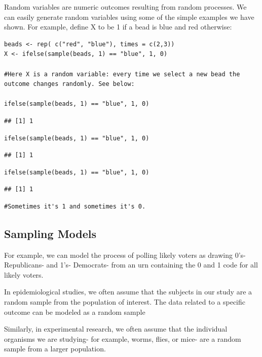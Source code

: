 \documentclass[
]{article}
\begin{document}
Random variables are numeric outcomes resulting from random processes.
We can easily generate random variables using some of the simple
examples we have shown. For example, define X to be 1 if a bead is blue
and red otherwise:

\begin{verbatim}
beads <- rep( c("red", "blue"), times = c(2,3))
X <- ifelse(sample(beads, 1) == "blue", 1, 0)

#Here X is a random variable: every time we select a new bead the outcome changes randomly. See below:

ifelse(sample(beads, 1) == "blue", 1, 0)
\end{verbatim}

\begin{verbatim}
## [1] 1
\end{verbatim}

\begin{verbatim}
ifelse(sample(beads, 1) == "blue", 1, 0)
\end{verbatim}

\begin{verbatim}
## [1] 1
\end{verbatim}

\begin{verbatim}
ifelse(sample(beads, 1) == "blue", 1, 0)
\end{verbatim}

\begin{verbatim}
## [1] 1
\end{verbatim}

\begin{verbatim}
#Sometimes it's 1 and sometimes it's 0.
\end{verbatim}

\hypertarget{sampling-models}{%
\subsection{Sampling Models}\label{sampling-models}}

For example, we can model the process of polling likely voters as
drawing 0's- Republicans- and 1's- Democrats- from an urn containing the
0 and 1 code for all likely voters.

In epidemiological studies, we often assume that the subjects in our
study are a random sample from the population of interest. The data
related to a specific outcome can be modeled as a random sample

Similarly, in experimental research, we often assume that the individual
organisms we are studying- for example, worms, flies, or mice- are a
random sample from a larger population.
\end{document}
